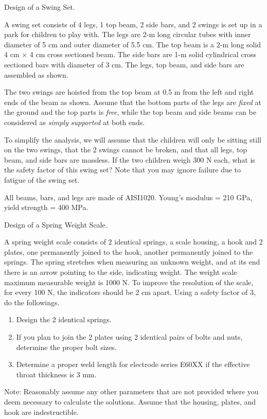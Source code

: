 \documentclass[
10pt,
a4paper,
openany,
svgnames,
]{book}
\newcommand{\exercise}{%
\item \label{lab:\arabic{chapter}.\arabic{exercisesi}}  %
}
\begin{document}
\begin{exercises}
  \exercise Design of a Swing Set.
  
  A swing set consists of 4 legs, 1 top beam, 2 side bars, and 2 swings is set up in a park for children to play with. The legs are 2-m long circular tubes with inner diameter of 5 cm and outer diameter of 5.5 cm. The top beam is a 2-m long solid 4 cm $\times$ 4 cm cross sectioned beam. The side bars are 1-m solid cylindrical cross sectioned bars with diameter of 3 cm. The legs, top beam, and side bars are assembled as shown.

  The two swings are hoisted from the top beam at 0.5 m from the left and right ends of the beam as shown. Assume that the bottom parts of the legs are \emph{fixed} at the ground and the top parts is \emph{free}, while the top beam and side beams can be considered as \emph{simply supported} at both ends.
  
  To simplify the analysis, we will assume that the children will only be sitting still on the two swings, that the 2 swings cannot be broken, and that all legs, top beam, and side bars are massless. If the two children weigh 300 N each, what is the safety factor of this swing set? Note that you may ignore failure due to fatigue of the swing set.
  
  All beams, bars, and legs are made of AISI1020. Young’s modulus = 210 GPa, yield strength = 400 MPa.
  
  \exercise Design of a Spring Weight Scale.
  
  A spring weight scale consists of 2 identical springs, a scale housing, a hook and 2 plates, one permanently joined to the hook, another permanently joined to the springs. The spring stretches when measuring an unknown weight, and at its end there is an arrow pointing to the side, indicating weight. The weight scale maximum measurable weight is 1000 N. To improve the resolution of the scale, for every 100 N, the indicators should be 2 cm apart. Using a safety factor of 3, do the followings.
  
  \begin{enumerate}
  \item Design the 2 identical springs.
  \item If you plan to join the 2 plates using 2 identical pairs of bolts and nuts, determine the proper bolt sizes.
  \item Determine a proper weld length for electrode series E60XX if the effective throat thickness is 3 mm.
  \end{enumerate}
  Note: Reasonably assume any other parameters that are not provided where you deem necessary to calculate the solutions. Assume that the housing, plates, and hook are indestructible.
  

\end{exercises}
\end{document}

